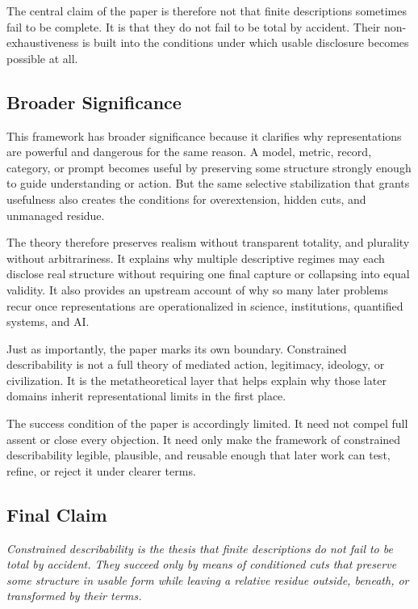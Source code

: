 \documentclass[11pt]{article}
\renewenvironment{quote}
  {\list{}{\leftmargin=1.4em \rightmargin=1.0em}%
   \item\relax\color{softink}\itshape}
  {\endlist}
\begin{document}
The central claim of the paper is therefore not that finite descriptions sometimes fail to be complete. It is that they do not fail to be total by accident. Their non-exhaustiveness is built into the conditions under which usable disclosure becomes possible at all.

\subsection{Broader Significance}

This framework has broader significance because it clarifies why representations are powerful and dangerous for the same reason. A model, metric, record, category, or prompt becomes useful by preserving some structure strongly enough to guide understanding or action. But the same selective stabilization that grants usefulness also creates the conditions for overextension, hidden cuts, and unmanaged residue. \cite{frigg_hartmann_models_sep,espeland_stevens_quantification,mitchell_model_cards}

The theory therefore preserves realism without transparent totality, and plurality without arbitrariness. It explains why multiple descriptive regimes may each disclose real structure without requiring one final capture or collapsing into equal validity. It also provides an upstream account of why so many later problems recur once representations are operationalized in science, institutions, quantified systems, and AI. \cite{chakravartty_scientific_realism_sep,ladyman_structural_realism_sep,scientific_pluralism_sep,herd_moynihan_administrative_burden,nist_ai_rmf}

Just as importantly, the paper marks its own boundary. Constrained describability is not a full theory of mediated action, legitimacy, ideology, or civilization. It is the metatheoretical layer that helps explain why those later domains inherit representational limits in the first place.

The success condition of the paper is accordingly limited. It need not compel full assent or close every objection. It need only make the framework of constrained describability legible, plausible, and reusable enough that later work can test, refine, or reject it under clearer terms.

\subsection{Final Claim}

\begin{quote}
Constrained describability is the thesis that finite descriptions do not fail to be total by accident. They succeed only by means of conditioned cuts that preserve some structure in usable form while leaving a relative residue outside, beneath, or transformed by their terms.
\end{quote}
\end{document}
